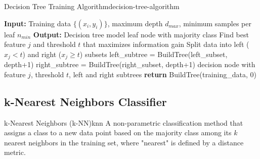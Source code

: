 \documentclass[12pt]{article}
\begin{document}
\begin{algorithmenv}{Decision Tree Training Algorithm}{decision-tree-algorithm}
\begin{algorithmic}[1]
\State \textbf{Input:} Training data $\{(x_i, y_i)\}$, maximum depth $d_{max}$, minimum samples per leaf $n_{min}$
\State \textbf{Output:} Decision tree model
        \State \Return leaf node with majority class
    \EndIf
    \State Find best feature $j$ and threshold $t$ that maximizes information gain
    \State Split data into left ($x_j < t$) and right ($x_j \geq t$) subsets
    \State left\_subtree = BuildTree(left\_subset, depth+1)
    \State right\_subtree = BuildTree(right\_subset, depth+1)
    \State \Return decision node with feature $j$, threshold $t$, left and right subtrees
\EndFunction
\State \textbf{return} BuildTree(training\_data, 0)
\end{algorithmic}
\end{algorithmenv}

\subsection{k-Nearest Neighbors Classifier}

\begin{definition}{k-Nearest Neighbors (k-NN)}{knn}
A non-parametric classification method that assigns a class to a new data point based on the majority class among its $k$ nearest neighbors in the training set, where "nearest" is defined by a distance metric.
\end{definition}
\end{document}
